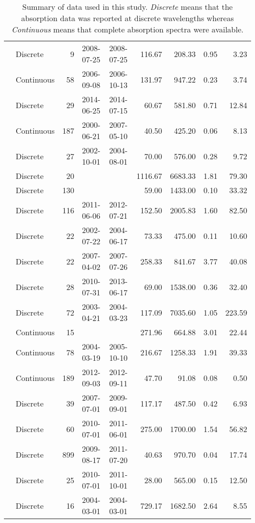 \begin{table}[ht]
\begin{tabular}{llrllrrrr}
  \citet{Nguyen2010} & Discrete &   9 & 2008-07-25 & 2008-07-25 & 116.67 & 208.33 & 0.95 & 3.23 \\ 
  \citet{Norman2011} & Continuous &  58 & 2006-09-08 & 2006-10-13 & 131.97 & 947.22 & 0.23 & 3.74 \\ 
  \citet{Oestreich2016} & Discrete &  29 & 2014-06-25 & 2014-07-15 & 60.67 & 581.80 & 0.71 & 12.84 \\ 
  \citet{Osburn2007} & Continuous & 187 & 2000-06-21 & 2007-05-10 & 40.50 & 425.20 & 0.06 & 8.13 \\ 
  \citet{Osburn2009} & Discrete &  27 & 2002-10-01 & 2004-08-01 & 70.00 & 576.00 & 0.28 & 9.72 \\ 
  \citet{Osburn2011a} & Discrete &  20 &  &  & 1116.67 & 6683.33 & 1.81 & 79.30 \\ 
  \citet{Osburn2016} & Discrete & 130 &  &  & 59.00 & 1433.00 & 0.10 & 33.32 \\ 
  \citet{Polaris2012} & Discrete & 116 & 2011-06-06 & 2012-07-21 & 152.50 & 2005.83 & 1.60 & 82.50 \\ 
  \citet{Retamal2007} & Discrete &  22 & 2002-07-22 & 2004-06-17 & 73.33 & 475.00 & 0.11 & 10.60 \\ 
  \citet{shank2009} & Discrete &  22 & 2007-04-02 & 2007-07-26 & 258.33 & 841.67 & 3.77 & 40.08 \\ 
  \citet{Shen2014} & Discrete &  28 & 2010-07-31 & 2013-06-17 & 69.00 & 1538.00 & 0.36 & 32.40 \\ 
  \citet{Sickman2010} & Discrete &  72 & 2003-04-21 & 2004-03-23 & 117.09 & 7035.60 & 1.05 & 223.59 \\ 
  \citet{Stedmon2007a} & Continuous &  15 &  &  & 271.96 & 664.88 & 3.01 & 22.44 \\ 
  \citet{Stedmon2011} & Continuous &  78 & 2004-03-19 & 2005-10-10 & 216.67 & 1258.33 & 1.91 & 39.33 \\ 
  \citet{Stedmon2015} & Continuous & 189 & 2012-09-03 & 2012-09-11 & 47.70 & 91.08 & 0.08 & 0.50 \\ 
  \citet{Tehrani2013} & Discrete &  39 & 2007-07-01 & 2009-09-01 & 117.17 & 487.50 & 0.42 & 6.93 \\ 
  \citet{Wagner2015} & Discrete &  60 & 2010-07-01 & 2011-06-01 & 275.00 & 1700.00 & 1.54 & 56.82 \\ 
  \citet{Werdell2003} & Discrete & 899 & 2009-08-17 & 2011-07-20 & 40.63 & 970.70 & 0.04 & 17.74 \\ 
  \citet{Yang2013a} & Discrete &  25 & 2010-07-01 & 2011-10-01 & 28.00 & 565.00 & 0.15 & 12.50 \\ 
  \citet{Zhang2005} & Discrete &  16 & 2004-03-01 & 2004-03-01 & 729.17 & 1682.50 & 2.64 & 8.55 \\ 
   \hline
\end{tabular}
\endgroup
\caption{Summary of data used in this study. \textit{Discrete} means that the 
absorption data was reported at discrete wavelengths whereas 
\textit{Continuous} means that complete absorption spectra were available.} 
\end{table}
